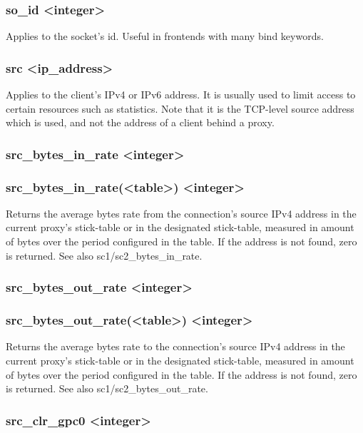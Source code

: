 \subsubsection[so\_id]{so\_id <integer>}
  Applies to the socket's id. Useful in frontends with many bind keywords.

\subsubsection[src]{src <ip\_address>}
  Applies to the client's IPv4 or IPv6 address. It is usually used to limit
  access to certain resources such as statistics. Note that it is the TCP-level
  source address which is used, and not the address of a client behind a proxy.

\subsubsection[src\_bytes\_in\_rate]{src\_bytes\_in\_rate <integer>}
\subsubsection*{src\_bytes\_in\_rate(<table>) <integer>}
  Returns the average bytes rate from the connection's source IPv4 address in
  the current proxy's stick-table or in the designated stick-table, measured in
  amount of bytes over the period configured in the table. If the address is
  not found, zero is returned. See also sc1/sc2\_bytes\_in\_rate.

\subsubsection[src\_bytes\_out\_rate]{src\_bytes\_out\_rate <integer>}
\subsubsection*{src\_bytes\_out\_rate(<table>) <integer>}
  Returns the average bytes rate to the connection's source IPv4 address in the
  current proxy's stick-table or in the designated stick-table, measured in
  amount of bytes over the period configured in the table. If the address is
  not found, zero is returned. See also sc1/sc2\_bytes\_out\_rate.

\subsubsection[src\_clr\_gpc0]{src\_clr\_gpc0 <integer>}
